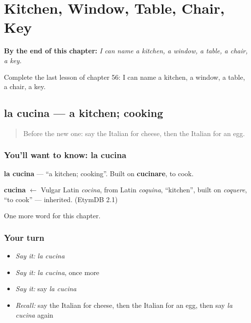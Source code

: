 
\chapter{Kitchen, Window, Table, Chair, Key}
\label{ch:it-kitchen-window-table-chair-key}

\begin{chapteropening}
\textbf{By the end of this chapter:} \emph{I can name a kitchen, a window, a table, a chair, a key.}

Complete the last lesson of chapter 56: I can name a kitchen, a window, a table, a chair, a key.
\end{chapteropening}

\section[la cucina]{la cucina — a kitchen; cooking}

\label{lesson:IT-C56-cucina}



\begin{quote}
Before the new one: say the Italian for cheese, then the Italian for an egg.
\end{quote}

\subsection*{You'll want to know: la cucina}
\textbf{la cucina} — \textquotedblleft{}a kitchen; cooking\textquotedblright{}. Built on \textbf{cucinare}, to cook.

\begin{cousinweb}
\textbf{cucina} $\leftarrow$ Vulgar Latin \emph{cocina}, from Latin \emph{coquina}, \textquotedblleft{}kitchen\textquotedblright{}, built on \emph{coquere}, \textquotedblleft{}to cook\textquotedblright{} — inherited. (EtymDB 2.1)
\end{cousinweb}

\begin{grammarlens}[title={What you've built}]
One more word for this chapter.
\end{grammarlens}

\subsection*{Your turn}
\begin{itemize}
\raggedright
  \item \emph{Say it:} \emph{la cucina}
  \item \emph{Say it:} \emph{la cucina}, once more
  \item \emph{Say it:} say \emph{la cucina}
  \item \emph{Recall:} say the Italian for cheese, then the Italian for an egg, then say \emph{la cucina} again
\end{itemize}

